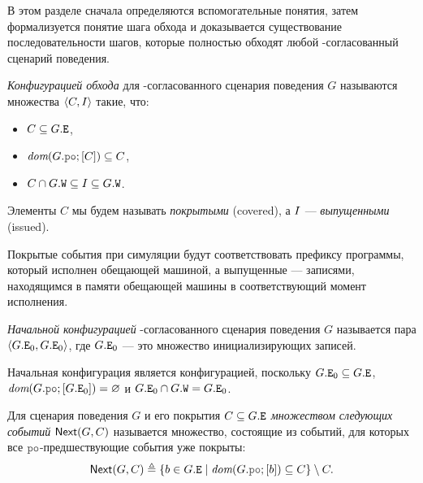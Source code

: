 В этом разделе
сначала определяются вспомогательные понятия,
затем формализуется понятие шага обхода и доказывается существование
последовательности шагов, которые полностью обходят любой \ARM-согласованный сценарий поведения.
\begin{definition}
\emph{Конфигурацией обхода} для \ARM-согласованного сценария поведения $G$
называются множества ${\langle{C, I}\rangle}$ такие, что:
\begin{itemize}
  \item $C \subseteq G.{\mathtt{E}}$,
  \item $\dom{G.\lPO;[C]}\suq C$,
  \item $C \cap G.{\mathtt{W}} \subseteq I \subseteq G.{\mathtt{W}}$.
\end{itemize}
Элементы $C$ мы будем называть \emph{покрытыми} (covered), а $I$ --- \emph{выпущенными} (issued).
\end{definition}
Покрытые события при симуляции будут соответствовать префиксу программы,
который исполнен обещающей машиной, а выпущенные --- записями, 
находящимся в памяти обещающей машины
в соответствующий момент исполнения.
\begin{definition}
\emph{Начальной конфигурацией} \ARM-согласованного сценария поведения $G$ называется пара ${\langle{G.{\mathtt{E}}_0, G.{\mathtt{E}}_0}\rangle}$,
где $G.{\mathtt{E}}_0$ --- это множество инициализирующих записей.
\end{definition}
Начальная конфигурация является конфигурацией, поскольку $G.{\mathtt{E}}_0 \subseteq G.{\mathtt{E}}$, $\dom{G.\lPO;[G.\lE_0]} = \emptyset$
и $G.{\mathtt{E}}_0 \cap G.{\mathtt{W}} = G.{\mathtt{E}}_0$.
\begin{definition}
  Для 
  сценария поведения $G$ и его покрытия $C \subseteq G.{\mathtt{E}}$ \emph{множеством следующих событий} ${\sf Next}(G, C)$
  называется множество, состоящие из событий, для которых все $\lPO$-предшествующие события уже покрыты:
  \[\nextset(G, C) \defeq \{b \in G.\lE \mid \dom{G.\lPO;[b]} \suq C\} \setminus C.\]
\end{definition}
